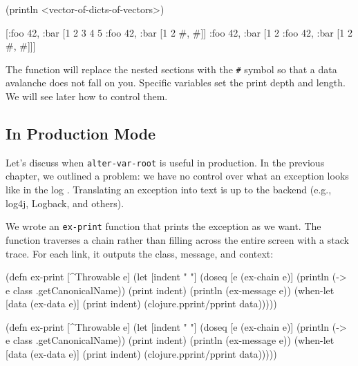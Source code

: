 \else

\begin{clojure}
(println <vector-of-dicts-of-vectors>)

[{:foo 42, :bar [1 2 3 4 5 {:foo 42, :bar [1 2 {#, #}]}]}
 {:foo 42, :bar [1 2 {:foo 42, :bar [1 2 {#, #}]}]}]
\end{clojure}

\fi

The function will replace the nested sections with the \verb|#| symbol so that a data avalanche does not fall on you.
Specific variables set the print depth and length.
We will see later how to control them.

\subsection{In Production Mode}

\label{install-logger}


Let's discuss when \verb|alter-var-root| is useful in production.
In the previous chapter, we outlined a problem: we have no control over what an exception looks like in the log .
Translating an exception into text is up to the backend (e.g., log4j, Logback, and others).

We wrote an \verb|ex-print| function that prints the exception as we want.
The function traverses a chain rather than filling across the entire screen with a stack trace.
For each link, it outputs the class, message, and context:

\ifx\DEVICETYPE\MOBILE

\begin{clojure}
(defn ex-print
  [^Throwable e]
  (let [indent "  "]
    (doseq [e (ex-chain e)]
      (println (-> e
                   class
                   .getCanonicalName))
      (print indent)
      (println (ex-message e))
      (when-let [data (ex-data e)]
        (print indent)
        (clojure.pprint/pprint data)))))
\end{clojure}

\else

\begin{clojure}
(defn ex-print
  [^Throwable e]
  (let [indent "  "]
    (doseq [e (ex-chain e)]
      (println (-> e class .getCanonicalName))
      (print indent)
      (println (ex-message e))
      (when-let [data (ex-data e)]
        (print indent)
        (clojure.pprint/pprint data)))))
\end{clojure}

